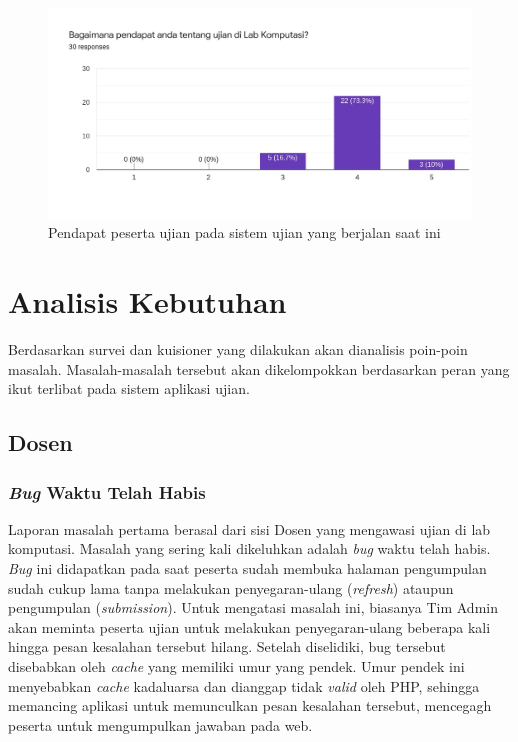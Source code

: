     \begin{figure}
        \centering
        \includegraphics[width=0.7\paperwidth]{Gambar/survey-student-2.pdf}
        \caption{Pendapat peserta ujian pada sistem ujian yang berjalan saat ini}
        \label{fig:kuisioner-student-2}
    \end{figure}
    
\section{Analisis Kebutuhan}
    Berdasarkan survei dan kuisioner yang dilakukan akan dianalisis poin-poin masalah. Masalah-masalah tersebut akan dikelompokkan berdasarkan peran yang ikut terlibat pada sistem aplikasi ujian.
    
\subsection{Dosen}
    \subsubsection{\textit{Bug} Waktu Telah Habis}\label{ref-prob-dosen-bug-waktu}
        Laporan masalah pertama berasal dari sisi Dosen yang mengawasi ujian di lab komputasi. Masalah yang sering kali dikeluhkan adalah \textit{bug} waktu telah habis. \textit{Bug} ini didapatkan pada saat peserta sudah membuka halaman pengumpulan sudah cukup lama tanpa melakukan penyegaran-ulang (\textit{refresh}) ataupun pengumpulan (\textit{submission}). Untuk mengatasi masalah ini, biasanya Tim Admin akan meminta peserta ujian untuk melakukan penyegaran-ulang beberapa kali hingga pesan kesalahan tersebut hilang. Setelah diselidiki, bug tersebut disebabkan oleh \textit{cache} yang memiliki umur yang pendek. Umur pendek ini menyebabkan \textit{cache} kadaluarsa dan dianggap tidak \textit{valid} oleh PHP, sehingga memancing aplikasi untuk memunculkan pesan kesalahan tersebut, mencegagh peserta untuk mengumpulkan jawaban pada web.
    
